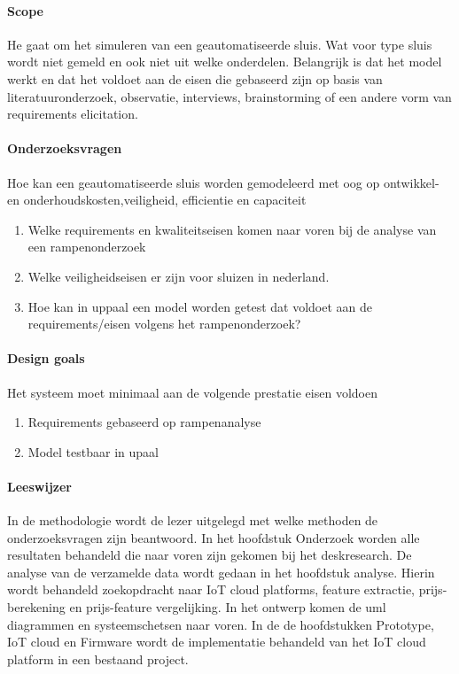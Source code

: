 \documentclass{article}
\begin{document}
	\paragraph{Scope}
	
	He gaat om het simuleren van een geautomatiseerde sluis. Wat voor type sluis wordt niet gemeld en ook niet uit welke onderdelen. Belangrijk is dat het model werkt en dat het voldoet aan de eisen die gebaseerd zijn op basis van literatuuronderzoek, observatie, interviews, brainstorming of een andere vorm van requirements elicitation.
	
	\paragraph{Onderzoeksvragen }
	
	Hoe kan een geautomatiseerde sluis worden gemodeleerd met oog op ontwikkel- en onderhoudskosten,veiligheid, efficientie en capaciteit
	
	
	
	
	
	\begin{enumerate}
		
		\item Welke requirements en kwaliteitseisen komen naar voren bij de analyse van een rampenonderzoek
		\item Welke veiligheidseisen er zijn voor sluizen in nederland. 
		\item Hoe kan in uppaal  een model worden getest dat voldoet aan de requirements/eisen volgens het rampenonderzoek?
	\end{enumerate}
	
	
	
	\paragraph{Design goals}
	Het systeem moet minimaal aan de volgende prestatie eisen voldoen 
	
	\begin{enumerate}
		\item   Requirements gebaseerd op rampenanalyse
		\item Model testbaar in upaal
	\end{enumerate}
	

	
	\paragraph{Leeswijzer}
	In  de methodologie wordt de lezer uitgelegd met welke methoden de onderzoeksvragen zijn beantwoord. In het hoofdstuk Onderzoek worden alle resultaten behandeld die naar voren zijn gekomen bij het deskresearch. De analyse van de verzamelde data wordt gedaan in het hoofdstuk analyse. Hierin wordt behandeld zoekopdracht naar IoT cloud platforms, feature extractie, prijs-berekening en prijs-feature vergelijking. In het ontwerp komen de uml diagrammen en systeemschetsen naar voren. In de  de hoofdstukken Prototype, IoT cloud en Firmware wordt de implementatie behandeld van het IoT cloud platform in een bestaand project.
	
\end{document}
